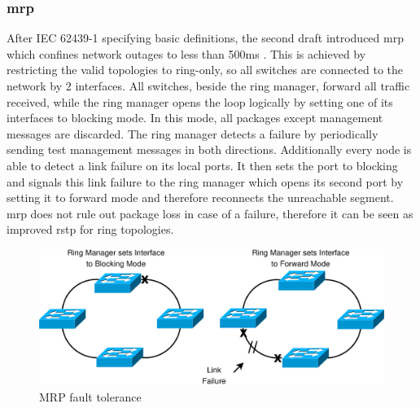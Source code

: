 \subsubsection{\gls{mrp}}
After IEC 62439-1 specifying basic definitions, the second draft introduced \gls{mrp} which confines network outages to less than 500ms \cite{6145654}.
This is achieved by restricting the valid topologies to ring-only, so all switches are connected to the network by 2 interfaces. All switches, beside the ring manager,
forward all traffic received, while the ring manager opens the loop logically by setting one of its interfaces to blocking mode.
In this mode, all packages except management messages are discarded. The ring manager detects a failure by periodically sending test management messages in both
directions. Additionally every node is able to detect a link failure on its local ports. It then sets the port to blocking and signals this link failure to the
ring manager which opens its second port by setting it to forward mode and therefore reconnects the unreachable segment.
\\
\gls{mrp} does not rule out package loss in case of a failure, therefore it can be seen as improved \gls{rstp} for ring topologies. 

\begin{figure}[H]
 \includegraphics[width=\linewidth]{figures/MRP2.eps}
 \caption{MRP fault tolerance}
\label{fig:mrp1}
\end{figure}


